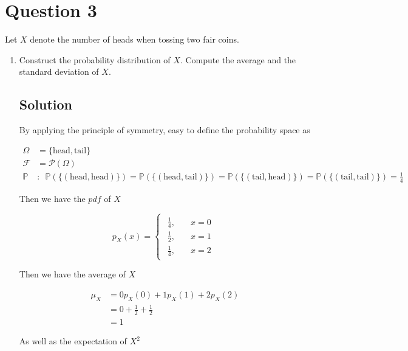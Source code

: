 \documentclass[12pt]{article}
\newcommand{\bP}{\mathbb{P}}
\begin{document}
	
	\section*{Question 3}
	
	\noindent Let $X$ denote the number of heads when tossing two fair coins.
	
	\bigskip
	
	\begin{enumerate}[start=1,label={\bfseries Part \arabic*:},leftmargin=0in]
		\bigskip\item Construct the probability distribution of $X$. Compute the average and the standard deviation of $X$.
		
		\subsection*{Solution}
		
			By applying the principle of symmetry, easy to define the probability space as
			
			\[
				\begin{aligned}
					\Omega &= \{\text{head}, \text{tail}\}\\
					\mathcal{F} &= \mathcal{P}(\Omega)\\
					\bP &:\enspace \bP(\{(\text{head}, \text{head})\}) = \bP(\{(\text{head}, \text{tail})\}) = \bP(\{(\text{tail}, \text{head})\}) = \bP(\{(\text{tail}, \text{tail})\}) = \frac{1}{4}
				\end{aligned}
			\]
		
			Then we have the $pdf$ of $X$
			
			\[
				p_X(x) =
				\begin{cases}
					\begin{aligned}
						\frac{1}{4},&\quad x = 0\\
						\frac{1}{2},&\quad x = 1\\
						\frac{1}{4},&\quad x = 2
					\end{aligned}
				\end{cases}
			\]
			
			Then we have the average of $X$
			
			\[
				\begin{aligned}
					\mu_X &= 0p_X(0) + 1p_X(1) + 2p_X(2)\\
					&= 0 + \frac{1}{2} + \frac{1}{2}\\
					&= 1
				\end{aligned}
			\]
			
			As well as the expectation of $X^2$
			

\end{enumerate}
\end{document}

